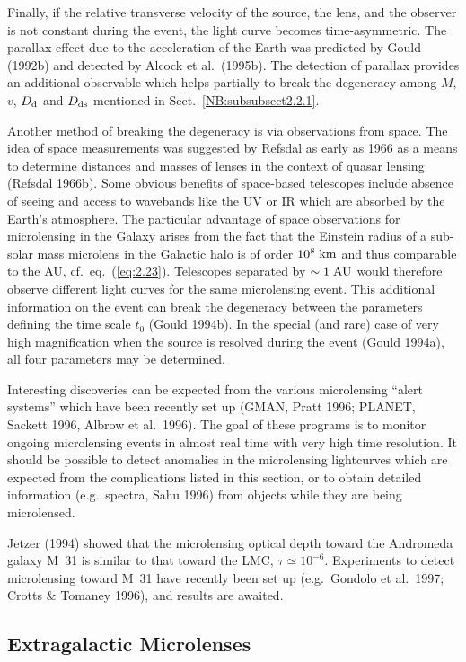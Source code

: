 \documentclass[a4paper,10pt]{article} %
\begin{document}
Finally, if the relative transverse velocity of the source, the lens,
and the observer is not constant during the event, the light curve
becomes time-asymmetric. The parallax effect due to the acceleration
of the Earth was predicted by Gould (1992b) and detected by Alcock et
al.\ (1995b). The detection of parallax provides an additional
observable which helps partially to break the degeneracy among $M$,
$v$, $D_{\rm d}$ and $D_{\rm ds}$ mentioned in Sect.\
\ref{NB:subsubsect2.2.1}.

Another method of breaking the degeneracy is via observations from
space. The idea of space measurements was suggested by Refsdal as
early as 1966 as a means to determine distances and masses of lenses
in the context of quasar lensing (Refsdal 1966b). Some obvious
benefits of space-based telescopes include absence of seeing and
access to wavebands like the UV or IR which are absorbed by the
Earth's atmosphere. The particular advantage of space observations for
microlensing in the Galaxy arises from the fact that the Einstein
radius of a sub-solar mass microlens in the Galactic halo is of order
$10^8\;{\rm km}$ and thus comparable to the AU, cf.\ eq.\
(\ref{eq:2.23}). Telescopes separated by $\sim1\;{\rm AU}$ would
therefore observe different light curves for the same microlensing
event. This additional information on the event can break the
degeneracy between the parameters defining the time scale $t_0$ (Gould
1994b). In the special (and rare) case of very high magnification when
the source is resolved during the event (Gould 1994a), all four
parameters may be determined.

Interesting discoveries can be expected from the various microlensing
``alert systems'' which have been recently set up (GMAN, Pratt 1996;
PLANET, Sackett 1996, Albrow et al.\ 1996). The goal of these
programs is to monitor ongoing microlensing events in almost real time
with very high time resolution. It should be possible to detect
anomalies in the microlensing lightcurves which are expected from the
complications listed in this section, or to obtain detailed
information (e.g.\ spectra, Sahu 1996) from objects while they are
being microlensed.

Jetzer (1994) showed that the microlensing optical depth toward the
Andromeda galaxy M~31 is similar to that toward the LMC,
$\tau\simeq10^{-6}$. Experiments to detect microlensing toward M~31
have recently been set up (e.g.\ Gondolo et al.\ 1997; Crotts \&
Tomaney 1996), and results are awaited.

\subsection{Extragalactic Microlenses}
\label{NB:subsubsect2.3}
\end{document}
